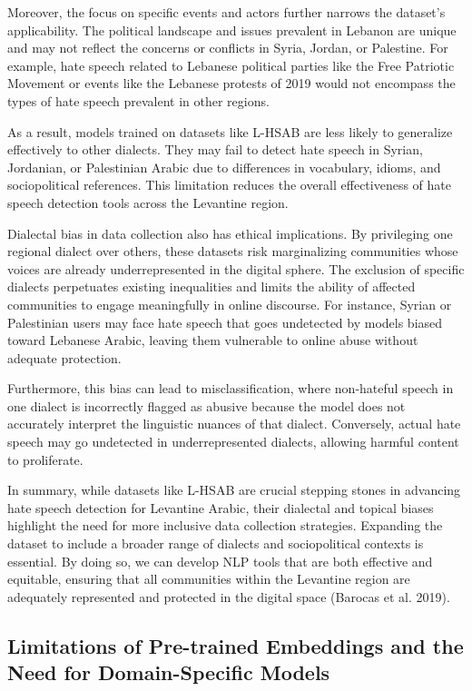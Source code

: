 \documentclass[11pt]{article}
\begin{document}
Moreover, the focus on specific events and actors further narrows the dataset's applicability. The political landscape and issues prevalent in Lebanon are unique and may not reflect the concerns or conflicts in Syria, Jordan, or Palestine. For example, hate speech related to Lebanese political parties like the Free Patriotic Movement or events like the Lebanese protests of 2019 would not encompass the types of hate speech prevalent in other regions.

As a result, models trained on datasets like L-HSAB are less likely to generalize effectively to other dialects. They may fail to detect hate speech in Syrian, Jordanian, or Palestinian Arabic due to differences in vocabulary, idioms, and sociopolitical references. This limitation reduces the overall effectiveness of hate speech detection tools across the Levantine region.

Dialectal bias in data collection also has ethical implications. By privileging one regional dialect over others, these datasets risk marginalizing communities whose voices are already underrepresented in the digital sphere. The exclusion of specific dialects perpetuates existing inequalities and limits the ability of affected communities to engage meaningfully in online discourse. For instance, Syrian or Palestinian users may face hate speech that goes undetected by models biased toward Lebanese Arabic, leaving them vulnerable to online abuse without adequate protection. 

Furthermore, this bias can lead to misclassification, where non-hateful speech in one dialect is incorrectly flagged as abusive because the model does not accurately interpret the linguistic nuances of that dialect. Conversely, actual hate speech may go undetected in underrepresented dialects, allowing harmful content to proliferate.

In summary, while datasets like L-HSAB are crucial stepping stones in advancing hate speech detection for Levantine Arabic, their dialectal and topical biases highlight the need for more inclusive data collection strategies. Expanding the dataset to include a broader range of dialects and sociopolitical contexts is essential. By doing so, we can develop NLP tools that are both effective and equitable, ensuring that all communities within the Levantine region are adequately represented and protected in the digital space (Barocas et al. 2019).


\subsection{Limitations of Pre-trained Embeddings and the Need for Domain-Specific Models}
\end{document}
